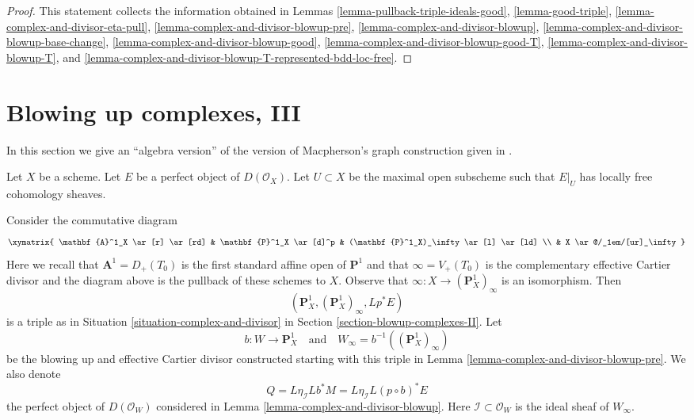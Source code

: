 \begin{proof}
This statement collects the information obtained in
Lemmas \ref{lemma-pullback-triple-ideals-good},
\ref{lemma-good-triple},
\ref{lemma-complex-and-divisor-eta-pull},
\ref{lemma-complex-and-divisor-blowup-pre},
\ref{lemma-complex-and-divisor-blowup},
\ref{lemma-complex-and-divisor-blowup-base-change},
\ref{lemma-complex-and-divisor-blowup-good},
\ref{lemma-complex-and-divisor-blowup-good-T},
\ref{lemma-complex-and-divisor-blowup-T}, and
\ref{lemma-complex-and-divisor-blowup-T-represented-bdd-loc-free}.
\end{proof}










\section{Blowing up complexes, III}
\label{section-blowup-complexes-III}

\noindent
In this section we give an ``algebra version'' of the version of
Macpherson's graph construction given in \cite[Section 18.1]{F}.

\medskip\noindent
Let $X$ be a scheme. Let $E$ be a perfect object of $D(\mathcal{O}_X)$.
Let $U \subset X$ be the maximal open subscheme such that
$E|_U$ has locally free cohomology sheaves.

\medskip\noindent
Consider the commutative diagram
$$
\xymatrix{
\mathbf{A}^1_X \ar[r] \ar[rd] &
\mathbf{P}^1_X \ar[d]^p &
(\mathbf{P}^1_X)_\infty \ar[l] \ar[ld] \\
& X \ar@/_1em/[ur]_\infty
}
$$
Here we recall that $\mathbf{A}^1 = D_+(T_0)$ is the first standard
affine open of $\mathbf{P}^1$ and that $\infty = V_+(T_0)$ is the
complementary effective Cartier divisor and the diagram above
is the pullback of these schemes to $X$. Observe that
$\infty : X \to (\mathbf{P}^1_X)_\infty$ is an isomorphism.
Then
$$
(\mathbf{P}^1_X, (\mathbf{P}^1_X)_\infty, Lp^*E)
$$
is a triple as in Situation \ref{situation-complex-and-divisor}
in Section \ref{section-blowup-complexes-II}.
Let
$$
b : W \longrightarrow \mathbf{P}^1_X\quad\text{and}\quad
W_\infty = b^{-1}((\mathbf{P}^1_X)_\infty)
$$
be the blowing up and effective Cartier divisor constructed
starting with this triple in
Lemma \ref{lemma-complex-and-divisor-blowup-pre}.
We also denote
$$
Q = L\eta_{\mathcal{I}} Lb^*M = L\eta_\mathcal{I} L(p \circ b)^*E
$$
the perfect object of $D(\mathcal{O}_W)$
considered in Lemma \ref{lemma-complex-and-divisor-blowup}.
Here $\mathcal{I} \subset \mathcal{O}_W$ is the ideal sheaf
of $W_\infty$.

